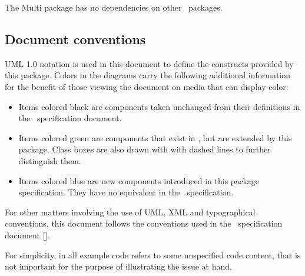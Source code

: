 The Multi package has no dependencies on other \SbmlLevelThree\ packages.

\subsection{Document conventions}
\label{def:Document_conventions}

UML 1.0 notation is used in this document to define the constructs provided by this package. Colors 
in the diagrams carry the following additional information for the benefit of those viewing the 
document on media that can display color:

\begin{itemize}
 \item {\color{black}} Items colored black are components taken unchanged 
      from their definitions in the \SbmlLevelThreeCore\ specification document.
 \item {\color{mediumgreen}} Items colored green are components that exist in 
      \SbmlLevelThreeCore, but are extended by this package. Class boxes are also drawn with with 
      dashed lines to further distinguish them.
 \item {\color{sbmlblue}} Items colored blue are new components introduced in this 
      package specification. They have no equivalent in  the \SbmlLevelThreeCore\ specification. 
\end{itemize}
 
For other matters involving the use of UML, XML and typographical conventions, this document follows the conventions
used in the \SbmlLevelThreeCore\ specification document [\cite{ref:sbmll3v1}].

For simplicity,  in all example code refers to some unspecified code content, that is not important for the purpose of illustrating the issue at hand.
